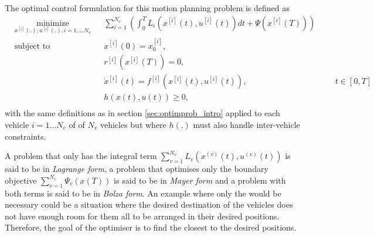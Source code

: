\par The optimal control formulation for this motion planning problem is defined as
\begin{equation}
    \label{eq:multi_cost}
    \begin{aligned}
    & \underset{x^{[i]}(.),u^{[i]}(.),i= 1,\dots N_v}{\text{minimize}} && \sum_{i=1}^{N_v} \left(\int_0^T L_i (x^{[i]}(t),u^{[i]}(t))dt + \Psi (x^{[i]}(T)) \right)\\
    & \text{subject to}  && x^{[i]}(0) = x_0^{[i]}, \\
        & && r^{[i]}(x^{[i]}(T)) = 0, \\
        & && \dot{x}^{[i]}(t) = f^{[i]} (x^{[i]}(t), u^{[i]}(t)), &&& t \in [0,T]\\
        & && h(x(t),u(t)) \geq 0, \\
    \end{aligned}
\end{equation}
with the same definitions as in section \ref{sec:optimprob_intro} applied to each vehicle $i=1\dots N_v$ of of $N_v$ vehicles but where $h(.)$ must also handle inter-vehicle constraints.
\par A problem that only has the integral term $\sum_{v=1}^{N_v} L_v(x^{(v)}(t),u^{(v)}(t))$ is said to be in \textit{Lagrange form}, a problem that optimises only the boundary objective $\sum_{v=1}^{N_v} \Psi_v(x(T))$ is said to be in \textit{Mayer form} and a problem with both terms is said to be in \textit{Bolza form}. An example where only the  would be necessary could be a situation where the desired destination of the vehicles does not have enough room for them all to be arranged in their desired positions. Therefore, the goal of the optimiser is to find the closest to the desired positions.

